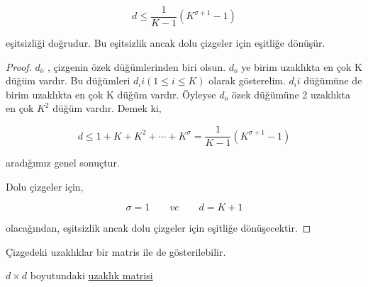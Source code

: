 \documentclass[11pt]{amsbook}
\begin{document}
    \[
        d \le \frac{1}{K - 1} (K^{\sigma+1} - 1)
    \]
    
    eşitsizliği doğrudur. Bu eşitsizlik ancak dolu çizgeler için eşitliğe dönüşür. 

    \begin{proof}
    
    $d_{\ddot{o}}$ , çizgenin özek düğümlerinden biri olsun. $d_{\ddot{o}}$ ye birim uzaklıkta en çok K düğüm vardır. Bu düğümleri $d_{ı} i(1 \le i \le K)$ olarak gösterelim. $d_{ı} i$ düğümüne de birim uzaklıkta en çok K düğüm vardır. Öyleyse $d_{\ddot{o}}$ özek düğümüne 2 uzaklıkta en çok $K^2$ düğüm vardır. Demek ki, 

    \[
        d \le 1 + K + K^2 + \cdots + K^\sigma = \frac{1}{K - 1} (K^{\sigma+1} - 1)
    \]
    
    aradığımız genel sonuçtur. 
    
    Dolu çizgeler için, 
    
    \[
        \sigma = 1 \qquad ve \qquad d = K + 1
    \]
    
    olacağından, eşitsizlik ancak dolu çizgeler için eşitliğe dönüşecektir.
    \end{proof}

    Çizgedeki uzaklıklar bir matris ile de gösterilebilir. 
    
    \begin{definition}
        {$d \times d$ boyutundaki \underline{uzaklık matrisi}}
    \end{definition}
\end{document}
